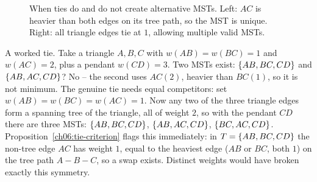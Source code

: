 \begin{figure}[H]
\centering
{}
\caption{When ties do and do not create alternative MSTs. Left: $AC$ is heavier than both edges on its tree path, so the MST is unique. Right: all triangle edges tie at $1$, allowing multiple valid MSTs.}
\label{ch06:fig-uniqueness-ties}
\end{figure}

\begin{labbox}
A worked tie. Take a triangle $A,B,C$ with $w(AB)=w(BC)=1$ and $w(AC)=2$, plus a pendant $w(CD)=3$. Two MSTs exist: $\{AB,BC,CD\}$ and $\{AB,AC,CD\}$? No -- the second uses $AC(2)$, heavier than $BC(1)$, so it is not minimum. The genuine tie needs equal competitors: set $w(AB)=w(BC)=w(AC)=1$. Now any two of the three triangle edges form a spanning tree of the triangle, all of weight $2$, so with the pendant $CD$ there are three MSTs: $\{AB,BC,CD\}$, $\{AB,AC,CD\}$, $\{BC,AC,CD\}$. Proposition~\ref{ch06:tie-criterion} flags this immediately: in $T=\{AB,BC,CD\}$ the non-tree edge $AC$ has weight $1$, equal to the heaviest edge ($AB$ or $BC$, both $1$) on the tree path $A\!-\!B\!-\!C$, so a swap exists. Distinct weights would have broken exactly this symmetry.
\end{labbox}

